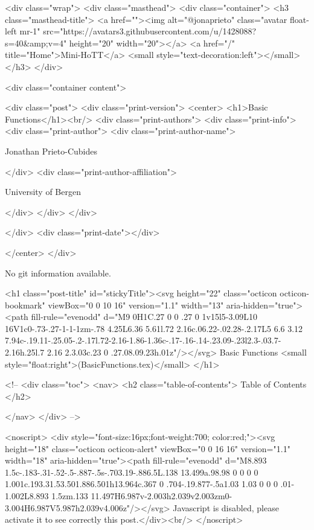     <div class="wrap">
      <div class="masthead">
        <div class="container">
          <h3 class="masthead-title">
            <a href=""><img alt="@jonaprieto" class="avatar float-left mr-1" src="https://avatars3.githubusercontent.com/u/1428088?s=40&amp;v=4" height="20" width="20"></a>
            <a href="/" title="Home">Mini-HoTT</a>
            <small style="text-decoration:left"></small>
          </h3>
        </div>
      
      <div class="container content">
        







<div class="post">
  <div class="print-version">
    <center>
      <h1>Basic Functions</h1><br/>
        <div class="print-authors">
          <div class="print-info">
            <div class="print-author">
              <div class="print-author-name">
                
                  Jonathan Prieto-Cubides
                
              </div>
              <div class="print-author-affiliation">
                
                  University of Bergen
                
                </div>
            </div>
          </div>
          
          
        </div>
        <div class="print-date"></div>
        
        
    </center>
  </div>

  
  No git information available.
  

  <h1 class="post-title" id="stickyTitle"><svg height="22" class="octicon octicon-bookmark" viewBox="0 0 10 16" version="1.1" width="13" aria-hidden="true"><path fill-rule="evenodd" d="M9 0H1C.27 0 0 .27 0 1v15l5-3.09L10 16V1c0-.73-.27-1-1-1zm-.78 4.25L6.36 5.61l.72 2.16c.06.22-.02.28-.2.17L5 6.6 3.12 7.94c-.19.11-.25.05-.2-.17l.72-2.16-1.86-1.36c-.17-.16-.14-.23.09-.23l2.3-.03.7-2.16h.25l.7 2.16 2.3.03c.23 0 .27.08.09.23h.01z"/></svg> Basic Functions <small style="float:right">(BasicFunctions.tex)</small>
  </h1>

  <!-- 
  <div class="toc">
    <nav>
    <h2 class="table-of-contents"> Table of Contents </h2>
      

    </nav>
  </div>
   -->

  <noscript>
  <div style="font-size:16px;font-weight:700; color:red;"><svg height="18" class="octicon octicon-alert" viewBox="0 0 16 16" version="1.1" width="18" aria-hidden="true"><path fill-rule="evenodd" d="M8.893 1.5c-.183-.31-.52-.5-.887-.5s-.703.19-.886.5L.138 13.499a.98.98 0 0 0 0 1.001c.193.31.53.501.886.501h13.964c.367 0 .704-.19.877-.5a1.03 1.03 0 0 0 .01-1.002L8.893 1.5zm.133 11.497H6.987v-2.003h2.039v2.003zm0-3.004H6.987V5.987h2.039v4.006z"/></svg> Javascript is disabled, please activate it to see correctly this post.</div><br/>
  </noscript>

